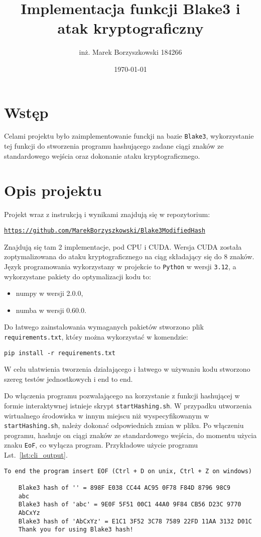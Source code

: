 \documentclass[polish,envcountsect,10pt]{article}
\title{Implementacja funkcji Blake3 i atak kryptograficzny}
\author{inż. Marek Borzyszkowski 184266}
\date{\today}
\begin{document}
\maketitle
\tableofcontents
\newpage
\section{Wstęp}
Celami projektu było zaimplementowanie funckji na bazie \texttt{Blake3}, 
wykorzystanie tej funkcji do stworzenia programu hashującego zadane ciągi znaków ze standardowego wejścia oraz dokonanie ataku kryptograficznego.
\section{Opis projektu}
Projekt wraz z instrukcją i wynikami znajdują się w repozytorium: \

\href{https://github.com/MarekBorzyszkowski/Blake3ModifiedHash}{\texttt{https://github.com/MarekBorzyszkowski/Blake3ModifiedHash}}

Znajdują się tam 2 implementacje, pod CPU i CUDA. Wersja CUDA została zoptymalizowana do ataku kryptograficznego na ciąg składający się do 8 znaków.
Język programowania wykorzystany w projekcie to \texttt{Python} w wersji \texttt{3.12}, a wykorzystane pakiety do optymalizacji kodu to:
\begin{itemize}
	\item numpy w wersji 2.0.0,
	\item numba w wersji 0.60.0.
\end{itemize}
Do łatwego zainstalowania wymaganych pakietów stworzono plik \texttt{requirements.txt}, który można wykorzystać w komendzie:

\texttt{pip install -r requirements.txt}

W celu ułatwienia tworzenia działającego i łatwego w używaniu kodu stworzono szereg testów jednostkowych i end to end. 

Do włączenia programu pozwalającego na korzystanie z funkcji hashującej w formie interaktywnej istnieje skrypt \texttt{startHashing.sh}. W przypadku utworzenia 
wirtualnego środowiska w innym miejscu niż wyspecyfikowanym w \texttt{startHashing.sh}, należy dokonać odpowiednich zmian w pliku.
Po włączeniu programu, hashuje on ciągi znaków ze standardowego wejścia, do momentu użycia znaku \texttt{EoF}, co wyłącza program.
Przykładowe użycie programu Lst.~\ref{lst:cli_output}.
\begin{lstlisting}[caption={Przykładowy przebieg działania programu}, label={lst:cli_output}]
	To end the program insert EOF (Ctrl + D on unix, Ctrl + Z on windows)

	Blake3 hash of '' = 898F E038 CC44 AC95 0F78 F84D 8796 98C9 
	abc
	Blake3 hash of 'abc' = 9E0F 5F51 00C1 44A0 9F84 CB56 D23C 9770 
	AbCxYz
	Blake3 hash of 'AbCxYz' = E1C1 3F52 3C78 7589 22FD 11AA 3132 D01C 
	Thank you for using Blake3 hash!	
\end{lstlisting}
\end{document}
